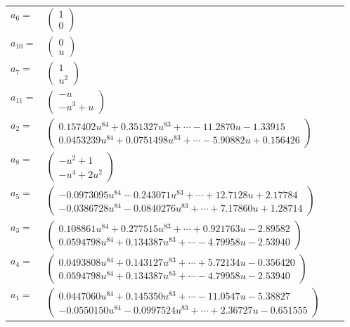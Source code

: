 \documentclass[1p]{elsarticle_modified}
\theoremstyle{definition}
\begin{document}
\begin{tabular}{m{7pt} m{180pt} m{7pt} m{180pt} }
\flushright $a_{6}=$&$\begin{pmatrix}1\\0\end{pmatrix}$ \\
\flushright $a_{10}=$&$\begin{pmatrix}0\\u\end{pmatrix}$ \\
\flushright $a_{7}=$&$\begin{pmatrix}1\\u^2\end{pmatrix}$ \\
\flushright $a_{11}=$&$\begin{pmatrix}- u\\- u^3+u\end{pmatrix}$ \\
\flushright $a_{2}=$&$\begin{pmatrix}0.157402 u^{84}+0.351327 u^{83}+\cdots-11.2870 u-1.33915\\0.0453239 u^{84}+0.0751498 u^{83}+\cdots-5.90882 u+0.156426\end{pmatrix}$ \\
\flushright $a_{8}=$&$\begin{pmatrix}- u^2+1\\- u^4+2 u^2\end{pmatrix}$ \\
\flushright $a_{5}=$&$\begin{pmatrix}-0.0973095 u^{84}-0.243071 u^{83}+\cdots+12.7128 u+2.17784\\-0.0386728 u^{84}-0.0840276 u^{83}+\cdots+7.17860 u+1.28714\end{pmatrix}$ \\
\flushright $a_{3}=$&$\begin{pmatrix}0.108861 u^{84}+0.277515 u^{83}+\cdots+0.921763 u-2.89582\\0.0594798 u^{84}+0.134387 u^{83}+\cdots-4.79958 u-2.53940\end{pmatrix}$ \\
\flushright $a_{4}=$&$\begin{pmatrix}0.0493808 u^{84}+0.143127 u^{83}+\cdots+5.72134 u-0.356420\\0.0594798 u^{84}+0.134387 u^{83}+\cdots-4.79958 u-2.53940\end{pmatrix}$ \\
\flushright $a_{1}=$&$\begin{pmatrix}0.0447060 u^{84}+0.145350 u^{83}+\cdots-11.0547 u-5.38827\\-0.0550150 u^{84}-0.0997524 u^{83}+\cdots+2.36727 u-0.651555\end{pmatrix}$ \\

\end{tabular}
\end{document}
